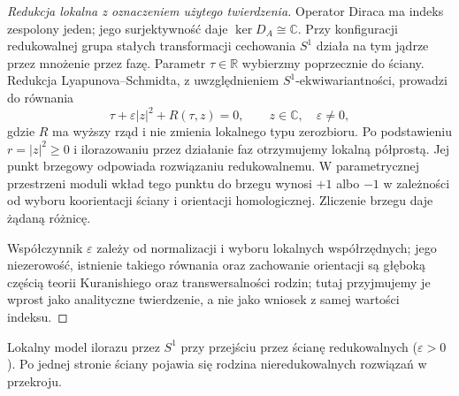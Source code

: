 \documentclass[11pt,a4paper]{report}
\numberwithin{equation}{section}
\theoremstyle{plain}
\theoremstyle{definition}
\theoremstyle{remark}
\begin{document}
\begin{proof}[Redukcja lokalna z oznaczeniem użytego twierdzenia]
Operator Diraca ma indeks zespolony jeden; jego
surjektywność daje $\ker D_A\cong\mathbb C$.
Przy konfiguracji redukowalnej grupa stałych
transformacji cechowania $S^1$ działa na tym jądrze
przez mnożenie przez fazę. Parametr $\tau\in\mathbb R$
wybierzmy poprzecznie do ściany. Redukcja
Lyapunova--Schmidta, z uwzględnieniem
$S^1$-ekwiwariantności, prowadzi do równania
\[
\tau+\varepsilon|z|^2+R(\tau,z)=0,
\qquad z\in\mathbb C,\quad\varepsilon\ne0,
\]
gdzie $R$ ma wyższy rząd i nie zmienia lokalnego typu
zerozbioru. Po podstawieniu $r=|z|^2\ge0$ i ilorazowaniu
przez działanie faz otrzymujemy lokalną półprostą.
Jej punkt brzegowy odpowiada rozwiązaniu redukowalnemu.
W parametrycznej przestrzeni moduli wkład tego punktu
do brzegu wynosi $+1$ albo $-1$ w zależności od
wyboru koorientacji ściany i orientacji homologicznej.
Zliczenie brzegu daje żądaną różnicę.

Współczynnik $\varepsilon$ zależy od normalizacji
i wyboru lokalnych współrzędnych; jego niezerowość,
istnienie takiego równania oraz zachowanie orientacji
są głęboką częścią teorii
Kuranishiego oraz transwersalności rodzin; tutaj
przyjmujemy je wprost jako analityczne twierdzenie,
a nie jako wniosek z samej wartości indeksu.
\end{proof}

\begin{center}

{\footnotesize Lokalny model ilorazu przez $S^1$ przy przejściu przez
ścianę redukowalnych ($\varepsilon>0$). Po jednej stronie ściany
pojawia się rodzina nieredukowalnych rozwiązań w przekroju.}
\end{center}
\end{document}
